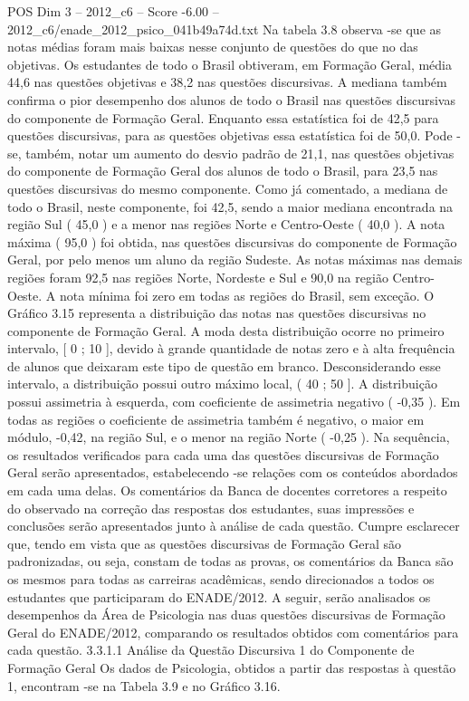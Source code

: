 \begin{textsample}{POS Dim 3 – 2012\_c6 – Score -6.00 – 2012\_c6/enade\_2012\_psico\_041b49a74d.txt}
Na tabela 3.8 observa -se que as notas médias foram mais baixas nesse conjunto de questões do que no das objetivas.
Os estudantes de todo o Brasil obtiveram, em Formação Geral, média 44,6 nas questões objetivas e 38,2 nas questões discursivas.
A mediana também confirma o pior desempenho dos alunos de todo o Brasil nas questões discursivas do componente de Formação Geral.
Enquanto essa estatística foi de 42,5 para questões discursivas, para as questões objetivas essa estatística foi de 50,0.
Pode -se, também, notar um aumento do desvio padrão de 21,1, nas questões objetivas do componente de Formação Geral dos alunos de todo o Brasil, para 23,5 nas questões discursivas do mesmo componente.
Como já comentado, a mediana de todo o Brasil, neste componente, foi 42,5, sendo a maior mediana encontrada na região Sul ( 45,0 ) e a menor nas regiões Norte e Centro-Oeste ( 40,0 ).
A nota máxima ( 95,0 ) foi obtida, nas questões discursivas do componente de Formação Geral, por pelo menos um aluno da região Sudeste.
As notas máximas nas demais regiões foram 92,5 nas regiões Norte, Nordeste e Sul e 90,0 na região Centro-Oeste.
A nota mínima foi zero em todas as regiões do Brasil, sem exceção.
O Gráfico 3.15 representa a distribuição das notas nas questões discursivas no componente de Formação Geral.
A moda desta distribuição ocorre no primeiro intervalo, [ 0 ; 10 ], devido à grande quantidade de notas zero e à alta frequência de alunos que deixaram este tipo de questão em branco.
Desconsiderando esse intervalo, a distribuição possui outro máximo local, ( 40 ; 50 ].
A distribuição possui assimetria à esquerda, com coeficiente de assimetria negativo ( -0,35 ).
Em todas as regiões o coeficiente de assimetria também é negativo, o maior em módulo, -0,42, na região Sul, e o menor na região Norte ( -0,25 ).
Na sequência, os resultados verificados para cada uma das questões discursivas de Formação Geral serão apresentados, estabelecendo -se relações com os conteúdos abordados em cada uma delas.
Os comentários da Banca de docentes corretores a respeito do observado na correção das respostas dos estudantes, suas impressões e conclusões serão apresentados junto à análise de cada questão.
Cumpre esclarecer que, tendo em vista que as questões discursivas de Formação Geral são padronizadas, ou seja, constam de todas as provas, os comentários da Banca são os mesmos para todas as carreiras acadêmicas, sendo direcionados a todos os estudantes que participaram do ENADE/2012.
A seguir, serão analisados os desempenhos da Área de Psicologia nas duas questões discursivas de Formação Geral do ENADE/2012, comparando os resultados obtidos com comentários para cada questão. 3.3.1.1 Análise da Questão Discursiva 1 do Componente de Formação Geral Os dados de Psicologia, obtidos a partir das respostas à questão 1, encontram -se na Tabela 3.9 e no Gráfico 3.16.

\end{textsample}
